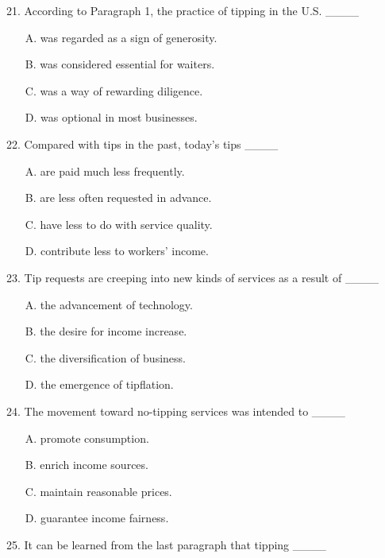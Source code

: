 \documentclass[UTF8,11pt]{ctexart}
\begin{document}
21. According to Paragraph 1, the practice of tipping in the U.S. \_\_\_\_


\begin{itemize}[leftmargin=2em,itemsep=.2em,topsep=.4em]\item[A.] was regarded as a sign of generosity.
\item[B.] was considered essential for waiters.
\item[C.] was a way of rewarding diligence.
\item[D.] was optional in most businesses.
\end{itemize}

22. Compared with tips in the past, today’s tips \_\_\_\_


\begin{itemize}[leftmargin=2em,itemsep=.2em,topsep=.4em]\item[A.] are paid much less frequently.
\item[B.] are less often requested in advance.
\item[C.] have less to do with service quality.
\item[D.] contribute less to workers’ income.
\end{itemize}

23. Tip requests are creeping into new kinds of services as a result of \_\_\_\_


\begin{itemize}[leftmargin=2em,itemsep=.2em,topsep=.4em]\item[A.] the advancement of technology.
\item[B.] the desire for income increase.
\item[C.] the diversification of business.
\item[D.] the emergence of tipflation.
\end{itemize}

24. The movement toward no-tipping services was intended to \_\_\_\_


\begin{itemize}[leftmargin=2em,itemsep=.2em,topsep=.4em]\item[A.] promote consumption.
\item[B.] enrich income sources.
\item[C.] maintain reasonable prices.
\item[D.] guarantee income fairness.
\end{itemize}

25. It can be learned from the last paragraph that tipping \_\_\_\_
\end{document}
